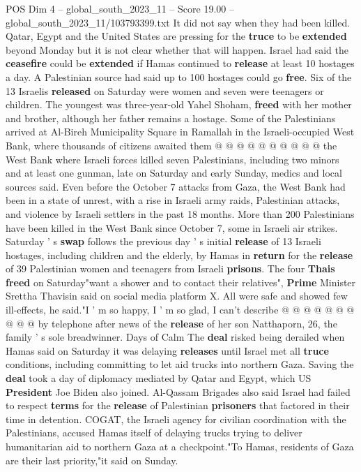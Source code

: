 \begin{textsample}{POS Dim 4 – global\_south\_2023\_11 – Score 19.00 – global\_south\_2023\_11/103793399.txt}
It did not say when they had been killed.
Qatar, Egypt and the United States are pressing for the \textbf{truce} to be \textbf{extended} beyond Monday but it is not clear whether that will happen.
Israel had said the \textbf{ceasefire} could be \textbf{extended} if Hamas continued to \textbf{release} at least 10 hostages a day.
A Palestinian source had said up to 100 hostages could go \textbf{free}.
Six of the 13 Israelis \textbf{released} on Saturday were women and seven were teenagers or children.
The youngest was three-year-old Yahel Shoham, \textbf{freed} with her mother and brother, although her father remains a hostage.
Some of the Palestinians arrived at Al-Bireh Municipality Square in Ramallah in the Israeli-occupied West Bank, where thousands of citizens awaited them @ @ @ @ @ @ @ @ @ @ the West Bank where Israeli forces killed seven Palestinians, including two minors and at least one gunman, late on Saturday and early Sunday, medics and local sources said.
Even before the October 7 attacks from Gaza, the West Bank had been in a state of unrest, with a rise in Israeli army raids, Palestinian attacks, and violence by Israeli settlers in the past 18 months.
More than 200 Palestinians have been killed in the West Bank since October 7, some in Israeli air strikes.
Saturday ' s \textbf{swap} follows the previous day ' s initial \textbf{release} of 13 Israeli hostages, including children and the elderly, by Hamas in \textbf{return} for the \textbf{release} of 39 Palestinian women and teenagers from Israeli \textbf{prisons}.
The four \textbf{Thais} \textbf{freed} on Saturday"want a shower and to contact their relatives", \textbf{Prime} Minister Srettha Thavisin said on social media platform X.
All were safe and showed few ill-effects, he said."I ' m so happy, I ' m so glad, I can't describe @ @ @ @ @ @ @ @ @ @ by telephone after news of the \textbf{release} of her son Natthaporn, 26, the family ' s sole breadwinner.
Days of Calm The \textbf{deal} risked being derailed when Hamas said on Saturday it was delaying \textbf{releases} until Israel met all \textbf{truce} conditions, including committing to let aid trucks into northern Gaza.
Saving the \textbf{deal} took a day of diplomacy mediated by Qatar and Egypt, which US \textbf{President} Joe Biden also joined.
Al-Qassam Brigades also said Israel had failed to respect \textbf{terms} for the \textbf{release} of Palestinian \textbf{prisoners} that factored in their time in detention.
COGAT, the Israeli agency for civilian coordination with the Palestinians, accused Hamas itself of delaying trucks trying to deliver humanitarian aid to northern Gaza at a checkpoint."To Hamas, residents of Gaza are their last priority,"it said on Sunday.

\end{textsample}
